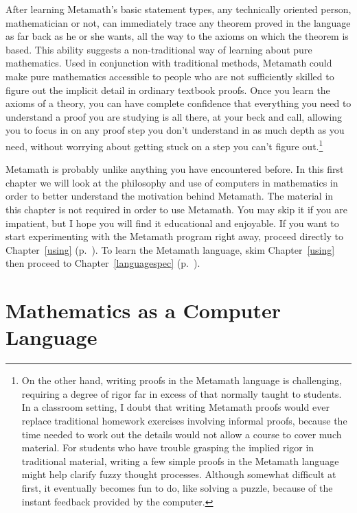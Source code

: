 After learning Metamath's basic statement types, any
tech\-ni\-cal\-ly ori\-ent\-ed person, mathematician or not, can
immediately trace
any theorem proved in the language as far back as he or she wants, all the way
to the axioms on which the theorem is based.  This ability suggests a
non-traditional way of learning about pure mathematics.  Used in conjunction
with traditional methods, Metamath could make pure mathematics accessible to
people who are not sufficiently skilled to figure out the implicit detail in
ordinary textbook proofs.  Once you learn the axioms of a theory, you can have
complete confidence that everything you need to understand a proof you are
studying is all there, at your beck and call, allowing you to focus in on any
proof step you don't understand in as much depth as you need, without worrying
about getting stuck on a step you can't figure out.\footnote{On the other
hand, writing proofs in the Metamath language is challenging, requiring
a degree of rigor far in excess of that normally taught to students.  In a
classroom setting, I doubt that writing Metamath proofs would ever replace
traditional homework exercises involving informal proofs, because the time
needed to work out the details would not allow a course to
cover much material.  For students who have trouble grasping the implied rigor
in traditional material, writing a few simple proofs in the Metamath language
might help clarify fuzzy thought processes.  Although somewhat difficult at
first, it eventually becomes fun to do, like solving a puzzle, because of the
instant feedback provided by the computer.}

Metamath is probably unlike anything you have
encountered before.  In this first chapter we will look at the philosophy and
use of computers in mathematics in order to better understand the motivation
behind Metamath.  The material in this chapter is not required in order to use
Metamath.  You may skip it if you are impatient, but I hope you will find it
educational and enjoyable.  If you want to start experimenting with the
Metamath program right away, proceed directly to Chapter~\ref{using}
(p.~\pageref{using}).  To
learn the Metamath language, skim Chapter~\ref{using} then proceed to
Chapter~\ref{languagespec} (p.~\pageref{languagespec}).

\section{Mathematics as a Computer Language}

